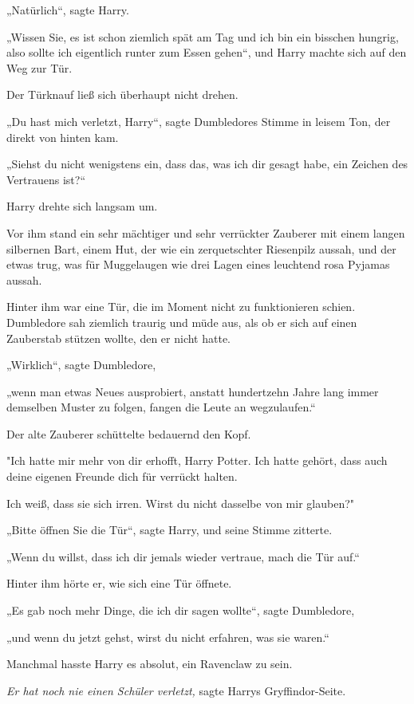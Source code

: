 {„Natürlich“, sagte Harry.

„Wissen Sie, es ist schon ziemlich spät am Tag und ich bin ein bisschen hungrig, also sollte ich eigentlich runter zum Essen gehen“, und Harry machte sich auf den Weg zur Tür.

Der Türknauf ließ sich überhaupt nicht drehen.

„Du hast mich verletzt, Harry“, sagte Dumbledores Stimme in leisem Ton, der direkt von hinten kam.

„Siehst du nicht wenigstens ein, dass das, was ich dir gesagt habe, ein Zeichen des Vertrauens ist?“

Harry drehte sich langsam um.

Vor ihm stand ein sehr mächtiger und sehr verrückter Zauberer mit einem langen silbernen Bart, einem Hut, der wie ein zerquetschter Riesenpilz aussah, und der etwas trug, was für Muggelaugen wie drei Lagen eines leuchtend rosa Pyjamas aussah.

Hinter ihm war eine Tür, die im Moment nicht zu funktionieren schien. Dumbledore sah ziemlich traurig und müde aus, als ob er sich auf einen Zauberstab stützen wollte, den er nicht hatte.

„Wirklich“, sagte Dumbledore,

„wenn man etwas Neues ausprobiert, anstatt hundertzehn Jahre lang immer demselben Muster zu folgen, fangen die Leute an wegzulaufen.“

Der alte Zauberer schüttelte bedauernd den Kopf.

"Ich hatte mir mehr von dir erhofft, Harry Potter. Ich hatte gehört, dass auch deine eigenen Freunde dich für verrückt halten.

Ich weiß, dass sie sich irren. Wirst du nicht dasselbe von mir glauben?"

„Bitte öffnen Sie die Tür“, sagte Harry, und seine Stimme zitterte.

„Wenn du willst, dass ich dir jemals wieder vertraue, mach die Tür auf.“

Hinter ihm hörte er, wie sich eine Tür öffnete.

„Es gab noch mehr Dinge, die ich dir sagen wollte“, sagte Dumbledore,

„und wenn du jetzt gehst, wirst du nicht erfahren, was sie waren.“

Manchmal hasste Harry es absolut, ein Ravenclaw zu sein.

\emph{Er hat noch nie einen Schüler verletzt,} sagte Harrys Gryffindor-Seite.

}
